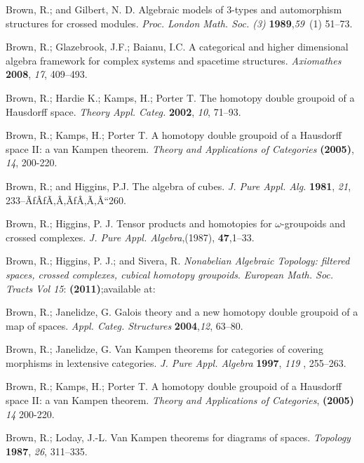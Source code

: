 \documentclass[12pt]{article}
\theoremstyle{plain}
\theoremstyle{definition}
\numberwithin{equation}{section}
\begin{document}
\begin{thebibliography}{199}
Brown, R.; and Gilbert, N. D. Algebraic models of {$3$}-types and automorphism structures   for crossed modules. \emph{Proc. London Math. Soc. (3)} {\bf 1989},{\em 59}~(1)  51--73.

Brown, R.; Glazebrook, J.F.; Baianu, I.C.  A categorical and higher dimensional algebra framework for complex systems and spacetime structures. \emph{Axiomathes} {\bf 2008}, {\em 17}, 409--493.

Brown, R.; Hardie K.; Kamps, H.; Porter T.  The homotopy double groupoid of a Hausdorff space. {\em Theory Appl. Categ.} {\bf 2002}, {\em 10}, 71--93.

Brown, R.;  Kamps, H.; Porter T.  A homotopy double groupoid of a Hausdorff space II: a van Kampen theorem.  {\em Theory and Applications of Categories} {\bf (2005)}, {\em 14}, 200-220.

Brown, R.; and Higgins, P.J.  The algebra of cubes.  {\em J. Pure Appl. Alg.} {\bf 1981}, {\em 21}, 233--ÃƒÂƒÃ‚Â‚ÃƒÂ‚Ã‚Â“260.

Brown, R.; Higgins, P. J.  Tensor products and homotopies for $\omega$-groupoids and crossed complexes. \emph{J. Pure Appl. Algebra},(1987), {\bf 47},1--33.

Brown, R.; Higgins, P. J.; and Sivera, R. {\em Nonabelian Algebraic Topology: filtered spaces, crossed complexes, cubical homotopy
groupoids}. \emph{European Math. Soc. Tracts Vol 15}: {\bf (2011)};available at: %

Brown, R.; Janelidze, G. Galois theory and a new homotopy double groupoid of a map of spaces. \textit{Appl. Categ. Structures} {\bf 2004},{\em 12}, 63--80. %

Brown, R.; Janelidze, G.  Van Kampen theorems for categories of covering morphisms in lextensive categories. \textit{J. Pure Appl. Algebra} {\bf 1997}, {\em119} , 255--263.

Brown, R.;  Kamps, H.; Porter T.  A homotopy double groupoid of a Hausdorff space II: a van Kampen theorem. {\em Theory and Applications of Categories}, {\bf (2005)} {\em 14}  200-220.

Brown, R.; Loday, J.-L. Van Kampen theorems for diagrams of spaces. {\em Topology} {\bf 1987}, {\em 26}, 311--335.


\end{thebibliography}
\end{document}

